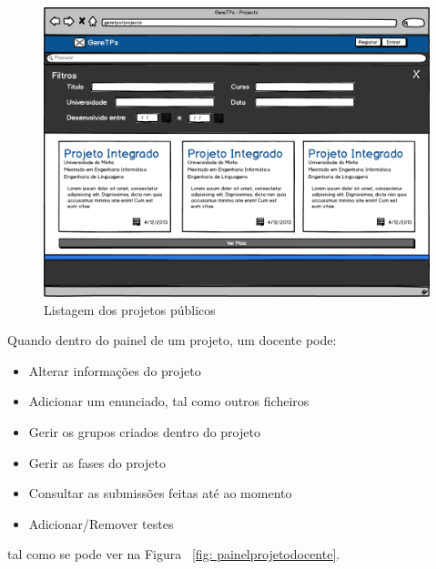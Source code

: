 \begin{figure}[htbp]
        \centering
        \includegraphics[width=1\textwidth]{images/prototipos/mockups/Projetos.png}
         \caption{Listagem dos projetos públicos}
         \label{fig: projetospublicos}
\end{figure}

Quando dentro do painel de um projeto, um docente pode:

\begin{itemize}
        \item Alterar informações do projeto
	\item Adicionar um enunciado, tal como outros ficheiros
	\item Gerir os grupos criados dentro do projeto
	\item Gerir as fases do projeto
	\item Consultar as submissões feitas até ao momento
        \item Adicionar/Remover testes
\end{itemize}
tal como se pode ver na Figura ~\ref{fig: painelprojetodocente}.\\

